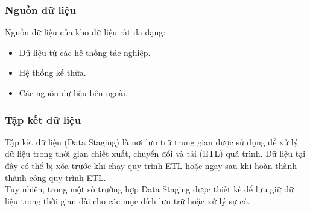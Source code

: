    \subsubsection{Nguồn dữ liệu}
    Nguồn dữ liệu của kho dữ liệu rất đa dạng:
    \begin{itemize}[label=$-$]
        \item Dữ liệu từ các hệ thống tác nghiệp.
        \item Hệ thống kế thừa.
        \item Các nguồn dữ liệu bên ngoài.
    \end{itemize}
\subsubsection{Tập kết dữ liệu}
Tập kết dữ liệu (Data Staging) là nơi lưu trữ trung gian được sử dụng để xử lý dữ liệu trong thời gian chiết xuất, chuyển đổi và tải (ETL) quá trình. Dữ liệu tại đây có thể bị xóa trước khi chạy quy trình ETL hoặc ngay sau khi hoàn thành thành công quy trình ETL.\\
    Tuy nhiên, trong một số trường hợp Data Staging được thiết kế để
lưu giữ dữ liệu trong thời gian dài cho các mục đích lưu trữ hoặc xử lý sự cố.
